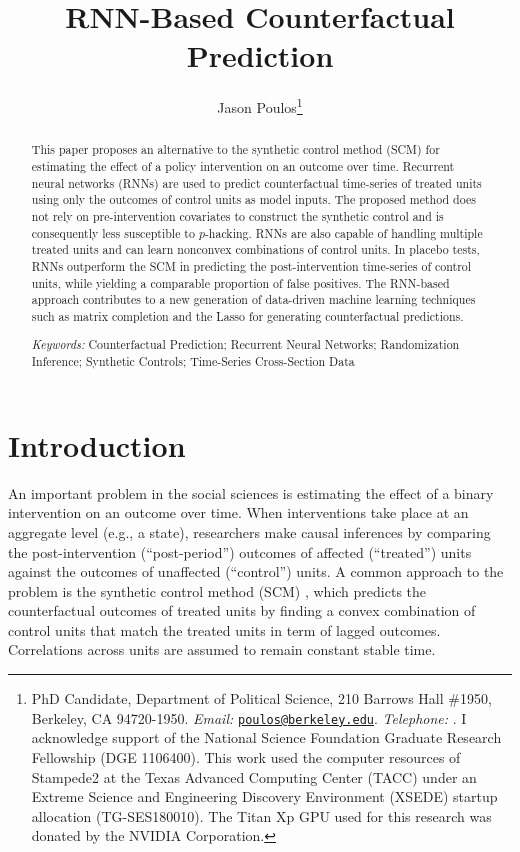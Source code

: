 \documentclass[hidelinks,12pt]{article}
\title{RNN-Based Counterfactual Prediction}
\author[ ]{Jason Poulos\thanks{PhD Candidate, Department of Political Science, 210 Barrows Hall \#1950, Berkeley, CA 94720-1950. \emph{Email:} \href{mailto:poulos@berkeley.edu}{\nolinkurl{poulos@berkeley.edu}}. \emph{Telephone:} \Plus 1\Minus 510\Minus 642\Minus 6323. I acknowledge support of the National Science Foundation Graduate Research Fellowship (DGE 1106400). This work used the computer resources of Stampede2 at the Texas Advanced Computing Center (TACC) under an Extreme Science and Engineering Discovery Environment (XSEDE) startup allocation (TG-SES180010). The Titan Xp GPU used for this research was donated by the NVIDIA Corporation.}}
\affil[ ]{University of California, Berkeley}
\date{}
\begin{document}
 
 
\begin{singlespacing}
\maketitle  
\end{singlespacing}
\thispagestyle{empty}

\begin{abstract}  %
\noindent 
This paper proposes an alternative to the synthetic control method (SCM) for estimating the effect of a policy intervention on an outcome over time. Recurrent neural networks (RNNs) are used to predict counterfactual time-series of treated units using only the outcomes of control units as model inputs. The proposed method does not rely on pre-intervention covariates to construct the synthetic control and is consequently less susceptible to $p$-hacking. RNNs are also capable of handling multiple treated units and can learn nonconvex combinations of control units. In placebo tests, RNNs outperform the SCM in predicting the post-intervention time-series of control units, while yielding a comparable proportion of false positives. The RNN-based approach contributes to a new generation of data-driven machine learning techniques such as matrix completion and the Lasso for generating counterfactual predictions.
\\
\begin{singlespace}
	\emph{Keywords:} Counterfactual Prediction; Recurrent Neural Networks; Randomization Inference; Synthetic Controls; Time-Series Cross-Section Data
\end{singlespace}
\end{abstract}

\pagebreak
{}%

\section{Introduction} 

An important problem in the social sciences is estimating the effect of a binary intervention on an outcome over time. When interventions take place at an aggregate level (e.g., a state), researchers make causal inferences by comparing the post-intervention (``post-period'') outcomes of affected (``treated'') units against the outcomes of unaffected  (``control'') units. A common approach to the problem is the synthetic control method (SCM) \citep{abadie2010synthetic}, which predicts the counterfactual outcomes of treated units by finding a convex combination of control units that match the treated units in term of lagged outcomes. Correlations across units are assumed to remain constant stable time. 
\end{document}
